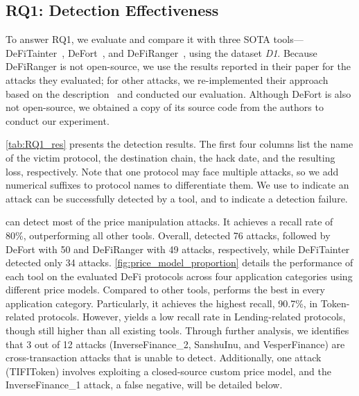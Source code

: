 

\subsection{RQ1: Detection Effectiveness}
\label{sec:RQ1}

To answer RQ1, we evaluate \tool and compare it with three SOTA tools—DeFiTainter~\cite{DeFiTainter23}, DeFort~\cite{DeFort24}, and DeFiRanger~\cite{DeFiRanger23}, using the dataset \textit{D1}.
Because DeFiRanger is not open-source, we use the results reported in their paper for the attacks they evaluated; for other attacks, we re-implemented their approach based on the description~\cite{DeFiRanger23} and conducted our evaluation.
Although DeFort is also not open-source, we obtained a copy of its source code from the authors to conduct our experiment.

\mytab\ref{tab:RQ1_res} presents the detection results. The first four columns list the name of the victim protocol, the destination chain, the hack date, and the resulting loss, respectively. Note that one protocol may face multiple attacks, so we add numerical suffixes to protocol names to differentiate them. We use \cmark to indicate an attack can be successfully detected by a tool, and \xmark to indicate a detection failure.

\tool can detect most of the price manipulation attacks.
It achieves a recall rate of 80\%, outperforming all other tools. 
Overall, \tool detected 76 attacks, followed by DeFort with 50 and DeFiRanger with 49 attacks, respectively, while DeFiTainter detected only 34 attacks.
\myfig\ref{fig:price_model_proportion} details the performance of each tool on the evaluated DeFi protocols across four application categories using different price models.
Compared to other tools, \tool performs the best in every application category.
Particularly, it achieves the highest recall, 90.7\%, in Token-related protocols. 
However, \tool yields a low recall rate in Lending-related protocols, though still higher than all existing tools. 
Through further analysis, we identifies that 3 out of 12 attacks (InverseFinance\_2, SanshuInu, and VesperFinance) are cross-transaction attacks that \tool is unable to detect.
Additionally, one attack (TIFIToken) involves exploiting a closed-source custom price model, and the InverseFinance\_1 attack, a false negative, will be detailed below.


